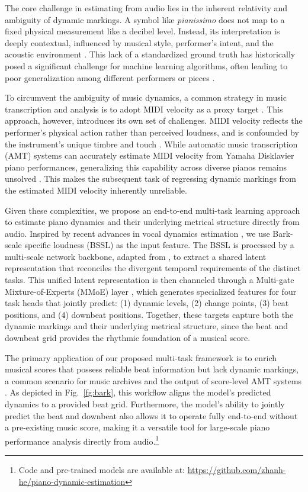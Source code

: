 \documentclass{article}
\begin{document}
The core challenge in estimating from audio lies in the inherent relativity and ambiguity of dynamic markings. A symbol like \textit{pianissimo} does not map to a fixed physical measurement like a decibel level. Instead, its interpretation is deeply contextual, influenced by musical style, performer's intent, and the acoustic environment \cite{kosta2014dynpiano, jones2023probingdyn}. This lack of a standardized ground truth has historically posed a significant challenge for machine learning algorithms, often leading to poor generalization among different performers or pieces \cite{kosta2016mapping, kosta2018mazurkabl}. 

To circumvent the ambiguity of music dynamics, a common strategy in music transcription and analysis is to adopt MIDI velocity as a proxy target \cite{van2014dynmidi, hawthorne2018onf, kim2023score, kim2024method}. This approach, however, introduces its own set of challenges. MIDI velocity reflects the performer's physical action rather than perceived loudness, and is confounded by the instrument's unique timbre and touch \cite{berndt2010modelling}. While automatic music transcription (AMT) systems can accurately estimate MIDI velocity from Yamaha Disklavier piano performances, generalizing this capability across diverse pianos remains unsolved \cite{edwards2024general}. This makes the subsequent task of regressing dynamic markings from the estimated MIDI velocity inherently unreliable.

Given these complexities, we propose an end-to-end multi-task learning approach to estimate piano dynamics and their underlying metrical structure directly from audio. Inspired by recent advances in vocal dynamics estimation \cite{narang2024automatic}, we use Bark-scale specific loudness (BSSL) as the input feature. The BSSL is processed by a multi-scale network backbone, adapted from \cite{li2023frame}, to extract a shared latent representation that reconciles the divergent temporal requirements of the distinct tasks. This unified latent representation is then channeled through a Multi-gate Mixture-of-Experts (MMoE) layer \cite{ma2018mmoe}, which generates specialized features for four task heads that jointly predict: (1) dynamic levels, (2) change points, (3) beat positions, and (4) downbeat positions. Together, these targets capture both the dynamic markings and their underlying metrical structure, since the beat and downbeat grid provides the rhythmic foundation of a musical score.

The primary application of our proposed multi-task framework is to enrich musical scores that possess reliable beat information but lack dynamic markings, a common scenario for music archives and the output of score-level AMT systems \cite{ijcai2024p862}. As depicted in Fig.~\ref{fg:bark}, this workflow aligns the model's predicted dynamics to a provided beat grid. Furthermore, the model's ability to jointly predict the beat and downbeat also allows it to operate fully end-to-end without a pre-existing music score, making it a versatile tool for large-scale piano performance analysis directly from audio.\footnote{Code and pre-trained models are available at: \url{https://github.com/zhanh-he/piano-dynamic-estimation}}
\end{document}
